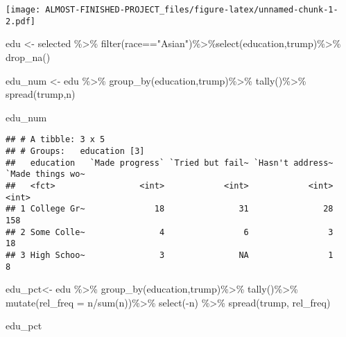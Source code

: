 \documentclass[
]{article}
\newenvironment{Shaded}{\begin{snugshade}}{\end{snugshade}}
\newcommand{\AttributeTok}[1]{\textcolor[rgb]{0.77,0.63,0.00}{#1}}
\newcommand{\FunctionTok}[1]{\textcolor[rgb]{0.00,0.00,0.00}{#1}}
\newcommand{\NormalTok}[1]{#1}
\newcommand{\OtherTok}[1]{\textcolor[rgb]{0.56,0.35,0.01}{#1}}
\newcommand{\SpecialCharTok}[1]{\textcolor[rgb]{0.00,0.00,0.00}{#1}}
\newcommand{\StringTok}[1]{\textcolor[rgb]{0.31,0.60,0.02}{#1}}
\begin{document}
\texttt{[image: ALMOST-FINISHED-PROJECT\_files/figure-latex/unnamed-chunk-1-2.pdf]}

\begin{Shaded}
\begin{Highlighting}[]
\NormalTok{edu }\OtherTok{\textless{}{-}}\NormalTok{ selected }\SpecialCharTok{\%\textgreater{}\%} \FunctionTok{filter}\NormalTok{(race}\SpecialCharTok{==}\StringTok{"Asian"}\NormalTok{)}\SpecialCharTok{\%\textgreater{}\%}\FunctionTok{select}\NormalTok{(education,trump)}\SpecialCharTok{\%\textgreater{}\%} \FunctionTok{drop\_na}\NormalTok{()}

\NormalTok{edu\_num }\OtherTok{\textless{}{-}}\NormalTok{ edu }\SpecialCharTok{\%\textgreater{}\%}
  \FunctionTok{group\_by}\NormalTok{(education,trump)}\SpecialCharTok{\%\textgreater{}\%}
  \FunctionTok{tally}\NormalTok{()}\SpecialCharTok{\%\textgreater{}\%}
  \FunctionTok{spread}\NormalTok{(trump,n)}

\NormalTok{edu\_num}
\end{Highlighting}
\end{Shaded}

\begin{verbatim}
## # A tibble: 3 x 5
## # Groups:   education [3]
##   education   `Made progress` `Tried but fail~ `Hasn't address~ `Made things wo~
##   <fct>                 <int>            <int>            <int>            <int>
## 1 College Gr~              18               31               28              158
## 2 Some Colle~               4                6                3               18
## 3 High Schoo~               3               NA                1                8
\end{verbatim}

\begin{Shaded}
\begin{Highlighting}[]
\NormalTok{edu\_pct}\OtherTok{\textless{}{-}}\NormalTok{ edu }\SpecialCharTok{\%\textgreater{}\%}
  \FunctionTok{group\_by}\NormalTok{(education,trump)}\SpecialCharTok{\%\textgreater{}\%}
  \FunctionTok{tally}\NormalTok{()}\SpecialCharTok{\%\textgreater{}\%}
  \FunctionTok{mutate}\NormalTok{(}\AttributeTok{rel\_freq =}\NormalTok{ n}\SpecialCharTok{/}\FunctionTok{sum}\NormalTok{(n))}\SpecialCharTok{\%\textgreater{}\%}
  \FunctionTok{select}\NormalTok{(}\SpecialCharTok{{-}}\NormalTok{n) }\SpecialCharTok{\%\textgreater{}\%}
  \FunctionTok{spread}\NormalTok{(trump, rel\_freq) }

\NormalTok{edu\_pct}
\end{Highlighting}
\end{Shaded}
\end{document}
